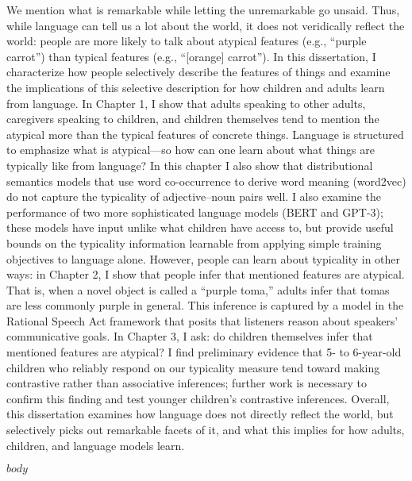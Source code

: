 \documentclass{ucetd}
\begin{document}
\abstract
We mention what is remarkable while letting the unremarkable go unsaid. Thus, while language can tell us a lot about the world, it does not veridically reflect the world: people are more likely to talk about atypical features (e.g., ``purple carrot'') than typical features (e.g., ``[orange] carrot''). In this dissertation, I characterize how people selectively describe the features of things and examine the implications of this selective description for how children and adults learn from language. In Chapter 1, I show that adults speaking to other adults, caregivers speaking to children, and children themselves tend to mention the atypical more than the typical features of concrete things. Language is structured to emphasize what is atypical—so how can one learn about what things are typically like from language? In this chapter I also show that distributional semantics models that use word co-occurrence to derive word meaning (word2vec) do not capture the typicality of adjective–noun pairs well. I also examine the performance of two more sophisticated language models (BERT and GPT-3); these models have input unlike what children have access to, but provide useful bounds on the typicality information learnable from applying simple training objectives to language alone. However, people can learn about typicality in other ways: in Chapter 2, I show that people infer that mentioned features are atypical. That is, when a novel object is called a ``purple toma,'' adults infer that tomas are less commonly purple in general. This inference is captured by a model in the Rational Speech Act framework that posits that listeners reason about speakers' communicative goals. In Chapter 3, I ask: do children themselves infer that mentioned features are atypical? I find preliminary evidence that 5- to 6-year-old children who reliably respond on our typicality measure tend toward making contrastive rather than associative inferences; further work is necessary to confirm this finding and test younger children's contrastive inferences. Overall, this dissertation examines how language does not directly reflect the world, but selectively picks out remarkable facets of it, and what this implies for how adults, children, and language models learn.

\mainmatter
$body$


\makebibliography

%
%
\end{document}
